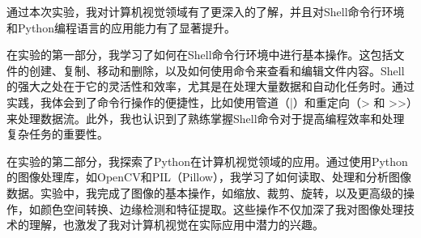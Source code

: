 \documentclass[a4paper, 12pt]{article}
\begin{document}
通过本次实验，我对计算机视觉领域有了更深入的了解，并且对Shell命令行环境和Python编程语言的应用能力有了显著提升。

在实验的第一部分，我学习了如何在Shell命令行环境中进行基本操作。这包括文件的创建、复制、移动和删除，以及如何使用命令来查看和编辑文件内容。Shell的强大之处在于它的灵活性和效率，尤其是在处理大量数据和自动化任务时。通过实践，我体会到了命令行操作的便捷性，比如使用管道（|）和重定向（> 和 >>）来处理数据流。此外，我也认识到了熟练掌握Shell命令对于提高编程效率和处理复杂任务的重要性。

在实验的第二部分，我探索了Python在计算机视觉领域的应用。通过使用Python的图像处理库，如OpenCV和PIL（Pillow），我学习了如何读取、处理和分析图像数据。实验中，我完成了图像的基本操作，如缩放、裁剪、旋转，以及更高级的操作，如颜色空间转换、边缘检测和特征提取。这些操作不仅加深了我对图像处理技术的理解，也激发了我对计算机视觉在实际应用中潜力的兴趣。
\end{document}

